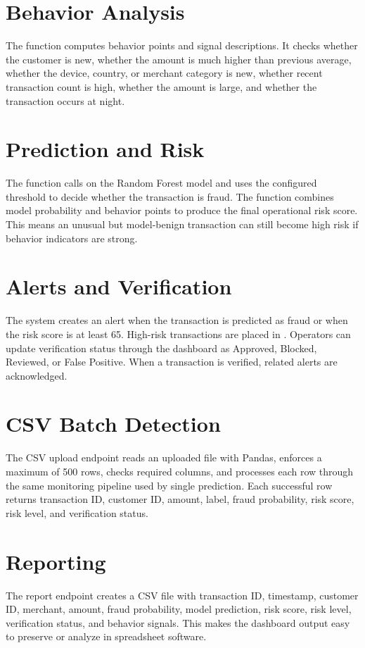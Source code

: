 \documentclass[12pt,a4paper]{report}
\begin{document}
\section{Behavior Analysis}
The function  computes behavior points and signal descriptions. It checks whether the customer is new, whether the amount is much higher than previous average, whether the device, country, or merchant category is new, whether recent transaction count is high, whether the amount is large, and whether the transaction occurs at night.

\section{Prediction and Risk}
The  function calls  on the Random Forest model and uses the configured threshold to decide whether the transaction is fraud. The  function combines model probability and behavior points to produce the final operational risk score. This means an unusual but model-benign transaction can still become high risk if behavior indicators are strong.

\section{Alerts and Verification}
The system creates an alert when the transaction is predicted as fraud or when the risk score is at least 65. High-risk transactions are placed in . Operators can update verification status through the dashboard as Approved, Blocked, Reviewed, or False Positive. When a transaction is verified, related alerts are acknowledged.

\section{CSV Batch Detection}
The CSV upload endpoint reads an uploaded file with Pandas, enforces a maximum of 500 rows, checks required columns, and processes each row through the same monitoring pipeline used by single prediction. Each successful row returns transaction ID, customer ID, amount, label, fraud probability, risk score, risk level, and verification status.

\section{Reporting}
The report endpoint creates a CSV file with transaction ID, timestamp, customer ID, merchant, amount, fraud probability, model prediction, risk score, risk level, verification status, and behavior signals. This makes the dashboard output easy to preserve or analyze in spreadsheet software.
\end{document}
